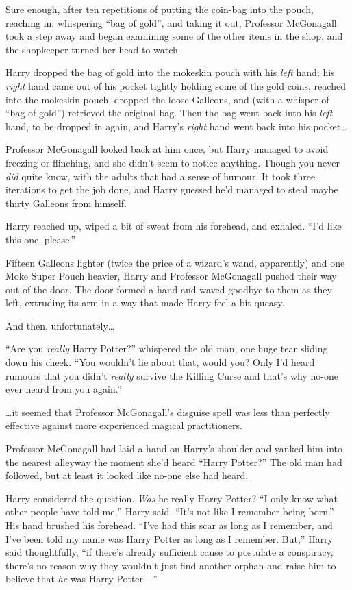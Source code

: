 Sure enough, after ten repetitions of putting the coin-bag into the pouch, reaching in, whispering “bag of gold”, and taking it out, Professor McGonagall took a step away and began examining some of the other items in the shop, and the shopkeeper turned her head to watch.

Harry dropped the bag of gold into the mokeskin pouch with his \emph{left} hand; his \emph{right} hand came out of his pocket tightly holding some of the gold coins, reached into the mokeskin pouch, dropped the loose Galleons, and (with a whisper of “bag of gold”) retrieved the original bag. Then the bag went back into his \emph{left} hand, to be dropped in again, and Harry’s \emph{right} hand went back into his pocket…

Professor McGonagall looked back at him once, but Harry managed to avoid freezing or flinching, and she didn’t seem to notice anything. Though you never \emph{did} quite know, with the adults that had a sense of humour. It took three iterations to get the job done, and Harry guessed he’d managed to steal maybe thirty Galleons from himself.

Harry reached up, wiped a bit of sweat from his forehead, and exhaled. “I’d like this one, please.”

Fifteen Galleons lighter (twice the price of a wizard’s wand, apparently) and one Moke Super Pouch  heavier, Harry and Professor McGonagall pushed their way out of the door. The door formed a hand and waved goodbye to them as they left, extruding its arm in a way that made Harry feel a bit queasy.

And then, unfortunately…

“Are you \emph{really} Harry Potter?” whispered the old man, one huge tear sliding down his cheek. “You wouldn’t lie about that, would you? Only I’d heard rumours that you didn’t \emph{really} survive the Killing Curse and that’s why no-one ever heard from you again.”

…it seemed that Professor McGonagall’s disguise spell was less than perfectly effective against more experienced magical practitioners.

Professor McGonagall had laid a hand on Harry’s shoulder and yanked him into the nearest alleyway the moment she’d heard “Harry Potter?” The old man had followed, but at least it looked like no-one else had heard.

Harry considered the question. \emph{Was} he really Harry Potter? “I only know what other people have told me,” Harry said. “It’s not like I remember being born.” His hand brushed his forehead. “I’ve had this scar as long as I remember, and I’ve been told my name was Harry Potter as long as I remember. But,” Harry said thoughtfully, “if there’s already sufficient cause to postulate a conspiracy, there’s no reason why they wouldn’t just find another orphan and raise him to believe that \emph{he} was Harry Potter—”


